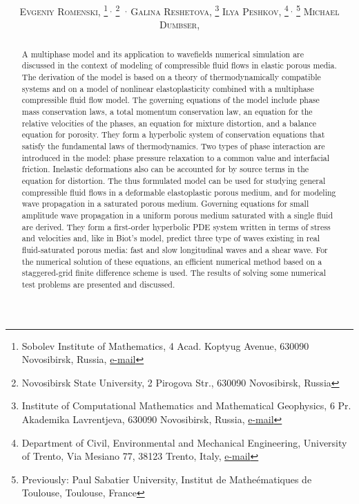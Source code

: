 \documentclass[3p,times,table]{article}
\title{\vspace{-15mm}\fontsize{14pt}{10pt}\bf\selectfont{
Modeling wavefields in saturated elastic porous media\\[1mm] based on 
thermodynamically 
compatible 
system theory for\\[1mm] multiphase mixtures}}
\author{\fontsize{10pt}{10pt}
	\textsc{Evgeniy Romenski},\hspace{-2mm}
	\thanks{Sobolev Institute of Mathematics, 4 Acad. Koptyug Avenue, 630090 
	Novosibirsk, 
	Russia, \href{mailto:evrom@math.nsc.ru}{e-mail}
		   }$\ ^, $
   \hspace{-3mm}
   \thanks{Novosibirsk State University, 2 Pirogova Str., 630090 Novosibirsk, Russia}
	\hspace{-1.5mm}$\ ^,$\samethanks[4]
\quad 
%
	\textsc{Galina Reshetova},\hspace{-2mm}
	\thanks{Institute of Computational Mathematics and Mathematical Geophysics, 6 Pr. 
	Akademika Lavrentjeva, 630090 Novosibirsk, Russia, 	\href{mailto:kgv@nmsf.sscc.ru}{e-mail}
		   }
\quad
	\textsc{Ilya Peshkov},\hspace{-2mm}
	\thanks{Department of Civil, Environmental and Mechanical Engineering, 
	University of Trento, Via Mesiano 77, 38123 Trento, Italy,
	\href{mailto:ilya.peshkov@unitn.it}{e-mail}
		   }$\ ^, $
	   \hspace{-2.5mm}
	   	\thanks{Previously: Paul Sabatier University, Institut de 
	   	Mathe\'ematiques 
	   	de Toulouse, Toulouse, France}
\quad
	\textsc{Michael Dumbser},\hspace{-2mm}
	\samethanks[4]
	   }
\begin{document}
 
\maketitle

\begin{abstract} 
\noindent
A multiphase model and its application to  wavefields numerical simulation 
are discussed in the context of modeling of compressible fluid flows in elastic 
porous media. The derivation of the model is based 
on  a theory of 
thermodynamically compatible systems and on  a model of nonlinear 
elastoplasticity combined with a multiphase compressible fluid flow model. The 
governing equations of the model include  phase mass conservation laws, a
total momentum conservation law, an equation for the relative velocities of the phases, an 
equation for mixture distortion, and a balance equation for 
porosity. They form a hyperbolic system of conservation equations that 
satisfy the fundamental laws of thermodynamics. Two types of phase interaction are 
introduced in the model: phase pressure relaxation to a common value and 
interfacial friction. Inelastic deformations also can be accounted for by  
source terms in the equation for distortion. The thus formulated model 
can be used for studying general compressible fluid flows in a deformable 
elastoplastic 
porous medium, and for modeling wave propagation in a saturated 
porous medium. 
Governing equations for small amplitude wave propagation in a uniform 
porous medium saturated 
with a single fluid are derived. They form a first-order hyperbolic PDE system 
written in 
terms of stress and velocities and, like in Biot's model, predict three type of 
waves existing in real fluid-saturated porous media: fast and 
slow longitudinal waves and a shear wave. For the 
numerical solution of these equations, an efficient numerical method based on a
staggered-grid finite 
difference scheme is used. The results of solving some numerical test problems are presented and discussed.

\end{abstract}

%
\end{document}

